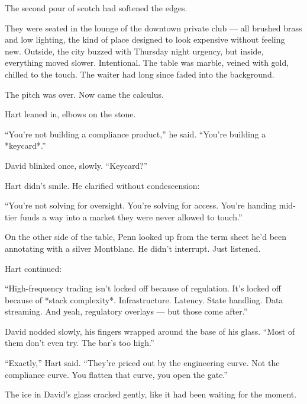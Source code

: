 The second pour of scotch had softened the edges.

They were seated in the lounge of the downtown private club — all brushed brass and low lighting, the kind of place 
designed to look expensive without feeling new. Outside, the city buzzed with Thursday night urgency, but inside, 
everything moved slower. Intentional. The table was marble, veined with gold, chilled to the touch. The waiter had 
long since faded into the background.

The pitch was over. Now came the calculus.

Hart leaned in, elbows on the stone.

“You’re not building a compliance product,” he said. “You’re building a *keycard*.”

David blinked once, slowly. “Keycard?”

Hart didn’t smile. He clarified without condescension:

“You’re not solving for oversight. You’re solving for access. You’re handing mid-tier funds a way into a market they were 
never allowed to touch.”

On the other side of the table, Penn looked up from the term sheet he’d been annotating with a silver Montblanc. He didn’t 
interrupt. Just listened.

Hart continued:

“High-frequency trading isn’t locked off because of regulation. It’s locked off because of *stack complexity*. 
Infrastructure. Latency. State handling. Data streaming. And yeah, regulatory overlays — but those come after.”

David nodded slowly, his fingers wrapped around the base of his glass. “Most of them don’t even try. The bar’s too high.”

“Exactly,” Hart said. “They’re priced out by the engineering curve. Not the compliance curve. You flatten that curve, you 
open the gate.”

The ice in David’s glass cracked gently, like it had been waiting for the moment.


\medskip

